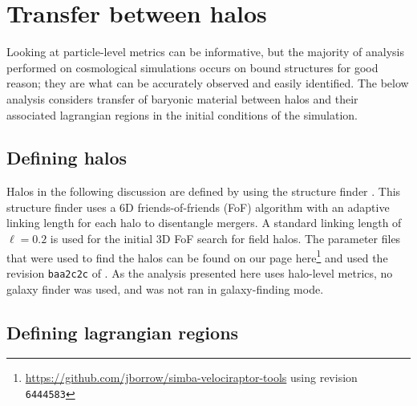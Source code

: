 \section{Transfer between halos}
\label{sec:transfer}

Looking at particle-level metrics can be informative, but the majority of
analysis performed on cosmological simulations occurs on bound structures for
good reason; they are what can be accurately observed and easily identified.
The below analysis considers transfer of baryonic material between halos and
their associated lagrangian regions in the initial conditions of the
simulation.

\subsection{Defining halos}

Halos in the following discussion are defined by using the \velociraptor{} structure
finder \citep{Elahi2019}. This structure finder uses a 6D friends-of-friends (FoF) algorithm
with an adaptive linking length for each halo to disentangle mergers. A standard
linking length of $\ell = 0.2$ is used for the initial 3D FoF search for field halos.
The parameter files that were used to find the halos can be found on our \github{}
page here\footnote{\url{https://github.com/jborrow/simba-velociraptor-tools} using
revision {\tt 6444583}} and used the revision {\tt baa2c2c} of
\velociraptor{}. As the analysis presented here uses halo-level metrics, no galaxy
finder was used, and \velociraptor{} was not ran in galaxy-finding mode.

\subsection{Defining lagrangian regions}


